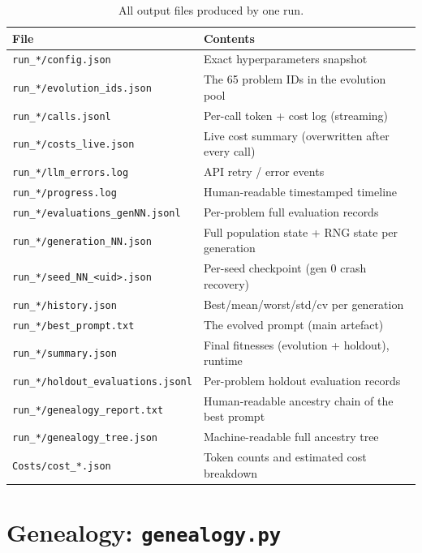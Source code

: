 \documentclass[11pt,a4paper]{report}
\newcommand{\pyfile}[1]{\texttt{#1}}
\newcommand{\fn}[1]{\texttt{#1}}
\begin{document}
\begin{table}[h]
\centering
\begin{tabular}{@{}p{6cm}p{6.5cm}@{}}
\toprule
\textbf{File} & \textbf{Contents} \\
\midrule
\fn{run\_*/config.json}              & Exact hyperparameters snapshot \\
\fn{run\_*/evolution\_ids.json}      & The 65 problem IDs in the evolution pool \\
\fn{run\_*/calls.jsonl}              & Per-call token + cost log (streaming) \\
\fn{run\_*/costs\_live.json}         & Live cost summary (overwritten after every call) \\
\fn{run\_*/llm\_errors.log}          & API retry / error events \\
\fn{run\_*/progress.log}             & Human-readable timestamped timeline \\
\fn{run\_*/evaluations\_genNN.jsonl} & Per-problem full evaluation records \\
\fn{run\_*/generation\_NN.json}      & Full population state + RNG state per generation \\
\fn{run\_*/seed\_NN\_<uid>.json}     & Per-seed checkpoint (gen 0 crash recovery) \\
\fn{run\_*/history.json}             & Best/mean/worst/std/cv per generation \\
\fn{run\_*/best\_prompt.txt}         & The evolved prompt (main artefact) \\
\fn{run\_*/summary.json}             & Final fitnesses (evolution + holdout), runtime \\
\fn{run\_*/holdout\_evaluations.jsonl} & Per-problem holdout evaluation records \\
\fn{run\_*/genealogy\_report.txt}    & Human-readable ancestry chain of the best prompt \\
\fn{run\_*/genealogy\_tree.json}     & Machine-readable full ancestry tree \\
\fn{Costs/cost\_*.json}              & Token counts and estimated cost breakdown \\
\bottomrule
\end{tabular}
\caption{All output files produced by one run.}
\end{table}


\chapter{Genealogy: \pyfile{genealogy.py}}
\end{document}

